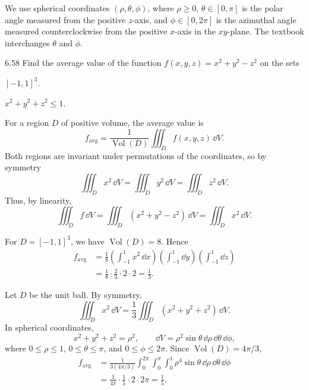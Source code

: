 \documentclass[11pt,oneside]{article}
\begin{document}

\begin{notation}
We use spherical coordinates $(\rho, \theta, \phi)$, where $\rho\ge0$,
$\theta\in[0, \pi]$ is the polar angle measured from the positive $z$-axis,
and $\phi\in[0, 2\pi]$ is the azimuthal angle measured counterclockwise
from the positive $x$-axis in the $xy$-plane. The textbook interchanges
$\theta$ and $\phi$.
\end{notation}

\begin{problem}{6.58}
Find the average value of the function $f(x, y, z)=x^2+y^2-z^2$
on the sets
\begin{problemsubparts}
    \item $[-1, 1]^3$.
    \item $x^2+y^2+z^2\le1$.
\end{problemsubparts}
\end{problem}
\begin{solution}
For a region $D$ of positive volume, the average value is
\[
    f_{\mathrm{avg}}=\frac{1}{\operatorname{Vol}(D)}
    \iiint_D f(x, y, z)\,\dd V.
\]
Both regions are invariant under permutations of the coordinates, so
by symmetry
\[
    \iiint_D x^2\,\dd V
    =\iiint_D y^2\,\dd V
    =\iiint_D z^2\,\dd V.
\]
Thus, by linearity,
\[
    \iiint_D f\,\dd V
    =\iiint_D(x^2+y^2-z^2)\,\dd V
    =\iiint_D x^2\,\dd V.
\]
\begin{problemsubparts}
    \item For $D=[-1, 1]^3$, we have $\operatorname{Vol}(D)=8$. Hence
    \[
    \begin{aligned}
        f_{\mathrm{avg}}
        &=\frac18\left(\int_{-1}^1x^2\,\dd x\right)
          \left(\int_{-1}^1\dd y\right)
          \left(\int_{-1}^1\dd z\right)\\
        &=\frac18\cdot\frac23\cdot2\cdot2
         =\boxed{\frac13}.
    \end{aligned}
    \]
    \item Let $D$ be the unit ball. By symmetry,
    \[
        \iiint_D x^2\,\dd V
        =\frac13\iiint_D(x^2+y^2+z^2)\,\dd V.
    \]
    In spherical coordinates,
    \[
        x^2+y^2+z^2=\rho^2, \qquad
        \dd V=\rho^2\sin\theta\,\dd\rho\,\dd\theta\,\dd\phi,
    \]
    where $0\le\rho\le1$, $0\le\theta\le\pi$, and $0\le\phi\le2\pi$.
    Since $\operatorname{Vol}(D)=4\pi/3$,
    \[
    \begin{aligned}
        f_{\mathrm{avg}}
        &=\frac{1}{3(4\pi/3)}
          \int_0^{2\pi}\int_0^\pi\int_0^1
          \rho^4\sin\theta\,\dd\rho\,\dd\theta\,\dd\phi\\
        &=\frac{1}{4\pi}\cdot\frac15\cdot2\cdot2\pi
         =\boxed{\frac15}.
    \end{aligned}
    \]
\end{problemsubparts}
\end{solution}
\end{document}
